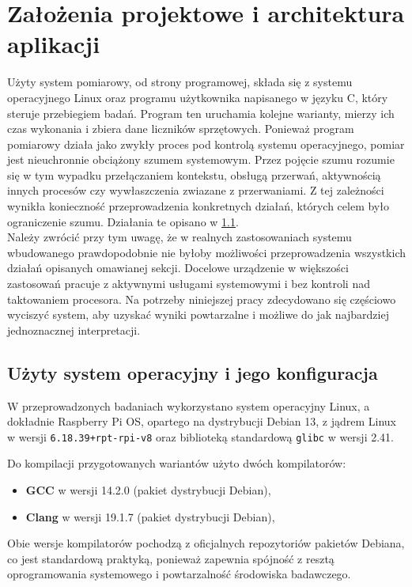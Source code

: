 \section{Założenia projektowe i architektura aplikacji}
Użyty system pomiarowy, od strony programowej, składa się z systemu operacyjnego
Linux oraz programu użytkownika napisanego w języku C, który steruje
przebiegiem badań. Program ten uruchamia kolejne warianty, mierzy ich czas wykonania
i zbiera dane liczników sprzętowych. Ponieważ program pomiarowy działa jako
zwykły proces pod kontrolą systemu operacyjnego, pomiar jest nieuchronnie obciążony szumem
systemowym. Przez pojęcie szumu rozumie się w tym wypadku przełączaniem kontekstu, obsługą przerwań, aktywnością innych
procesów czy wywłaszczenia zwiazane z przerwaniami. Z tej zależności wynikła konieczność przeprowadzenia konkretnych działań, których celem było ograniczenie szumu. 
Działania te opisano w \cref{KonfiguracjaRPIOS}. 
\\ Należy zwrócić przy tym uwagę, że w realnych zastosowaniach systemu wbudowanego prawdopodobnie nie byłoby
możliwości przeprowadzenia wszystkich działań opisanych omawianej sekcji.
Docelowe urządzenie w większości zastosowań pracuje z aktywnymi usługami systemowymi i bez kontroli nad taktowaniem procesora. Na potrzeby
niniejszej pracy zdecydowano się częściowo wyciszyć system, aby uzyskać
wyniki powtarzalne i możliwe do jak najbardziej jednoznacznej interpretacji.
\subsection{Użyty system operacyjny i jego konfiguracja}\label{KonfiguracjaRPIOS}
W przeprowadzonych badaniach wykorzystano system operacyjny Linux, a dokładnie Raspberry Pi OS, opartego na
dystrybucji Debian 13, z jądrem Linux w wersji \texttt{6.18.39+rpt-rpi-v8}
oraz biblioteką standardową \texttt{glibc} w wersji 2.41. 

Do kompilacji przygotowanych  wariantów użyto dwóch kompilatorów:
\begin{itemize}
    \item \textbf{GCC} w wersji 14.2.0 (pakiet dystrybucji Debian),
    \item \textbf{Clang} w wersji 19.1.7 (pakiet dystrybucji Debian),
\end{itemize}
Obie wersje kompilatorów pochodzą z oficjalnych repozytoriów pakietów Debiana,
co jest standardową praktyką, ponieważ zapewnia spójność z resztą
oprogramowania systemowego i powtarzalność środowiska badawczego.

